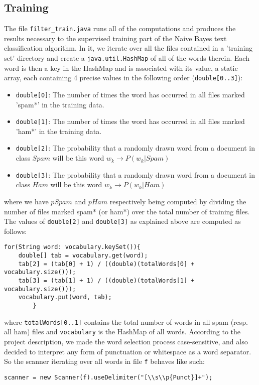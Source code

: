 \documentclass[12pt,a4paper]{report}
\begin{document}
\subsection{Training}
The file \texttt{filter\_train.java} runs all of the computations and produces the results necessary to the supervised training part of the Naive Bayes text classification algorithm. In it, we iterate over all the files contained in a 'training set' directory and create a \texttt{java.util.HashMap} of all of the words therein. Each word is then a key in the HashMap and is associated with its value, a static array, each containing 4 precise values in the following order (\texttt{double[0..3]}):
\begin{itemize}
\item \texttt{double[0]}: The number of times the word has occurred in all files marked 'spam*' in the training data.
\item \texttt{double[1]}: The number of times the word has occurred in all files marked 'ham*' in the training data.
\item \texttt{double[2]}: The probability that a randomly drawn word from a document in class $Spam$ will be this word $w_k \rightarrow P(w_k|Spam)$
\item \texttt{double[3]}: The probability that a randomly drawn word from a document in class $Ham$ will be this word $w_k \rightarrow P(w_k|Ham)$
\end{itemize} 
where we have $pSpam$ and $pHam$ respectively being computed by dividing the number of files marked spam* (or ham*) over the total number of training files. The values of \texttt{double[2]} and \texttt{double[3]} as explained above are computed as follows: 
\begin{lstlisting}
for(String word: vocabulary.keySet()){
	double[] tab = vocabulary.get(word);
	tab[2] = (tab[0] + 1) / ((double)(totalWords[0] + vocabulary.size()));
	tab[3] = (tab[1] + 1) / ((double)(totalWords[1] + vocabulary.size()));
	vocabulary.put(word, tab);
		}
\end{lstlisting}
where \texttt{totalWords[0..1]} contains the total number of words in all spam (resp. all ham) files and \texttt{vocabulary} is the HashMap of all words. According to the project description, we made the word selection process case-sensitive, and also decided to interpret any form of punctuation or whitespace as a word separator. So the scanner iterating over all words in file \texttt{f} behaves like such:
\begin{lstlisting}
scanner = new Scanner(f).useDelimiter("[\\s\\p{Punct}]+");
\end{lstlisting}
\end{document}
